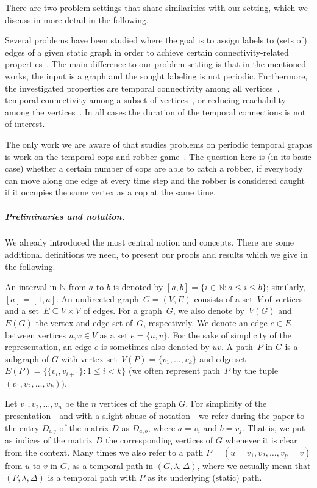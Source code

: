 \documentclass[a4paper,UKenglish,cleveref, autoref, thm-restate,anonymous]{lipics-v2021}
\begin{document}
There are two problem settings that share similarities with our setting, which we discuss in more detail in the following.

Several problems have been studied where the goal is to assign labels to (sets of) edges of a given static graph in order to achieve certain connectivity-related properties~\cite{KlobasMMS22,MertziosMS19,akrida2017complexity,enright2021assigning}. The main difference to our problem setting is that in the mentioned works, the input is a graph and the sought labeling is not periodic. Furthermore, the investigated properties are temporal connectivity among all vertices~\cite{KlobasMMS22,MertziosMS19,akrida2017complexity}, temporal connectivity among a subset of vertices~\cite{KlobasMMS22}, or reducing reachability among the vertices~\cite{enright2021assigning}. In all cases the duration of the temporal connections is not of interest.


The only work we are aware of that studies problems on periodic temporal graphs is work on the temporal cops and robber game~\cite{Morawietz021,MorawietzRW20,ErlebachS20}. The question here is (in its basic case) whether a certain number of cops are able to catch a robber, if everybody can move along one edge at every time step and the robber is considered caught if it occupies the same vertex as a cop at the same time. 




\subparagraph{Preliminaries and notation.}
We already introduced the most central notion and concepts. There are some additional definitions we need, to present our proofs and results which we give in the following. 

An interval in $\mathbb N$ from $a$ to $b$ is denoted by $[a,b] = \{ i\in \mathbb N  :  a \leq i \leq b\}$; similarly, $[a] = [1,a]$.
An undirected graph~$G=(V,E)$ consists of a set~$V$ of vertices 
and a set~$E \subseteq V \times V$ of edges.
For a graph~$G$, we also denote by~$V(G)$ and~$E(G)$ the vertex and edge set of~$G$, respectively.
We denote an edge $e \in E$ between vertices $u,v \in V$ as a set $e=\{u,v\}$.
For the sake of simplicity of the representation, an edge $e$ is sometimes also denoted by $uv$. 
A path~$P$ in $G$ is a subgraph of $G$ with vertex set~$V(P)=\{v_1,\dots,v_k\}$ and edge set~$E(P)=\{\{v_i,v_{i+1}\} :  1\leq i<k\}$
(we often represent path~$P$ by the tuple~$(v_1,v_2,\dots,v_k)$).





Let $v_1,v_2,\ldots,v_n$ be the $n$ vertices of the graph $G$. 
For simplicity of the presentation~--and with a slight abuse of notation--~we refer during the paper to the entry $D_{i,j}$ of the matrix $D$ as 
$D_{a,b}$, where $a=v_i$ and $b=v_j$. That is, we put as indices of the matrix $D$ the corresponding vertices of $G$ whenever it is clear from the context.
Many times we also refer to a path $P=(u=v_1, v_2, \dots, v_p=v)$ from $u$ to $v$ in $G$,
as a temporal path in $(G,\lambda,\Delta)$,
where we actually mean that $(P,\lambda,\Delta)$ is a temporal path with $P$ as its underlying (static) path.
\end{document}
